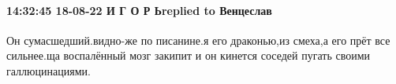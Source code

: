  
 
 
 
 

\paragraph{14:32:45 18-08-22 И Г О Р Ьreplied to Венцеслав}

Он сумасшедший.видно-же по писанине.я его драконью,из смеха,а его прёт все
сильнее.ща воспалённый мозг закипит и он кинется соседей пугать своими
галлюцинациями.

